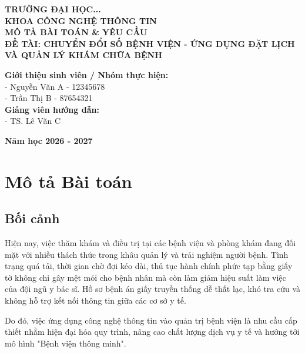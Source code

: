 \documentclass[12pt,a4paper]{article}
\begin{document}
\begin{titlepage}
    \centering
    \vspace*{2cm}
    
    {\Large \textbf{TRƯỜNG ĐẠI HỌC...}}\\[0.5cm]
    {\large \textbf{KHOA CÔNG NGHỆ THÔNG TIN}}\\[3cm]
    
    {\Huge \textbf{MÔ TẢ BÀI TOÁN \& YÊU CẦU}}\\[1cm]
    {\Large \textbf{ĐỀ TÀI: CHUYỂN ĐỔI SỐ BỆNH VIỆN - ỨNG DỤNG ĐẶT LỊCH VÀ QUẢN LÝ KHÁM CHỮA BỆNH}}\\[3cm]
    
    \begin{flushleft}
    \large
    \textbf{Giới thiệu sinh viên / Nhóm thực hiện:} \\
    - Nguyễn Văn A - 12345678 \\
    - Trần Thị B - 87654321 \\
    \vspace{1cm}
    \textbf{Giảng viên hướng dẫn:} \\
    - TS. Lê Văn C
    \end{flushleft}
    
    \vfill
    
    {\large \textbf{Năm học 2026 - 2027}}
\end{titlepage}

\tableofcontents
\newpage

\section{Mô tả Bài toán}

\subsection{Bối cảnh}
Hiện nay, việc thăm khám và điều trị tại các bệnh viện và phòng khám đang đối mặt với nhiều thách thức trong khâu quản lý và trải nghiệm người bệnh. Tình trạng quá tải, thời gian chờ đợi kéo dài, thủ tục hành chính phức tạp bằng giấy tờ không chỉ gây mệt mỏi cho bệnh nhân mà còn làm giảm hiệu suất làm việc của đội ngũ y bác sĩ. Hồ sơ bệnh án giấy truyền thống dễ thất lạc, khó tra cứu và không hỗ trợ kết nối thông tin giữa các cơ sở y tế. 

Do đó, việc ứng dụng công nghệ thông tin vào quản trị bệnh viện là nhu cầu cấp thiết nhằm hiện đại hóa quy trình, nâng cao chất lượng dịch vụ y tế và hướng tới mô hình "Bệnh viện thông minh".
\end{document}
